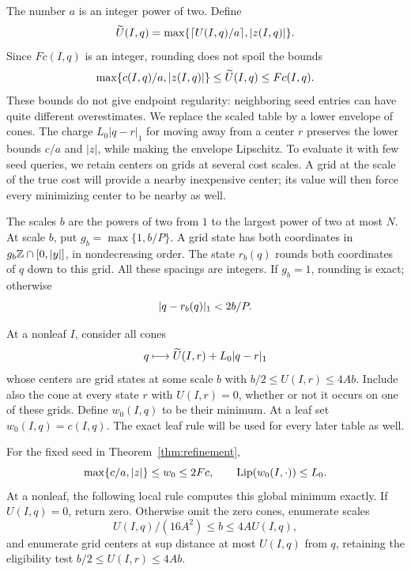 The number $a$ is an integer power of two.  Define
\[
 \widetilde U(I,q)=\max\{\lceil U(I,q)/a\rceil,\lvert z(I,q)\rvert\}.
\]
Since $Fc(I,q)$ is an integer, rounding does not spoil the bounds
\begin{equation}\label{eq:scaled-seed}
 \max\{c(I,q)/a,\lvert z(I,q)\rvert\}
 \le\widetilde U(I,q)\le Fc(I,q).
\end{equation}
These bounds do not give endpoint regularity: neighboring seed entries
can have quite different overestimates. We replace the scaled table by
a lower envelope of cones. The charge $L_0|q-r|_1$ for moving away from
a center $r$ preserves the lower bounds $c/a$ and $|z|$, while making
the envelope Lipschitz. To evaluate it with few seed queries, we retain
centers on grids at several cost scales. A grid at the scale of the true
cost will provide a nearby inexpensive center; its value will then
force every minimizing center to be nearby as well.

The scales $b$ are the powers of two from $1$ to the largest power of two
at most $N$.  At scale $b$, put $g_b=\max\{1,b/P\}$.  A grid state has
both coordinates in $g_b\mathbb Z\cap[0,|y|]$, in nondecreasing order.
The state $r_b(q)$ rounds both coordinates of $q$ down to this grid.
All these spacings are integers.  If $g_b=1$, rounding is exact;
otherwise
\begin{equation}\label{eq:grid-error}
 \lvert q-r_b(q)\rvert_1<2b/P.
\end{equation}

At a nonleaf $I$, consider all cones
\[
 q\longmapsto \widetilde U(I,r)+L_0\lvert q-r\rvert_1
\]
whose centers are grid states at some scale $b$ with
$b/2\le U(I,r)\le4Ab$.  Include also the cone at every state $r$ with
$U(I,r)=0$, whether or not it occurs on one of these grids.  Define
$w_0(I,q)$ to be their minimum.  At a leaf set $w_0(I,q)=c(I,q)$.
The exact leaf rule will be used for every later table as well.

\begin{lemma}\label{lem:initial-cones}
For the fixed seed in Theorem~\ref{thm:refinement},
\begin{equation}\label{eq:initial-cones}
 \max\{c/a,|z|\}\le w_0\le2Fc,
 \qquad \operatorname{Lip}(w_0(I,\cdot))\le L_0.
\end{equation}
At a nonleaf, the following local rule computes this global minimum
exactly.  If $U(I,q)=0$, return zero.  Otherwise omit the zero cones,
enumerate scales
\begin{equation}\label{eq:initial-local-scales}
 U(I,q)/(16A^2)\le b\le4A U(I,q),
\end{equation}
and enumerate grid centers at sup distance at most $U(I,q)$ from $q$,
retaining the eligibility test $b/2\le U(I,r)\le4Ab$.
\end{lemma}


